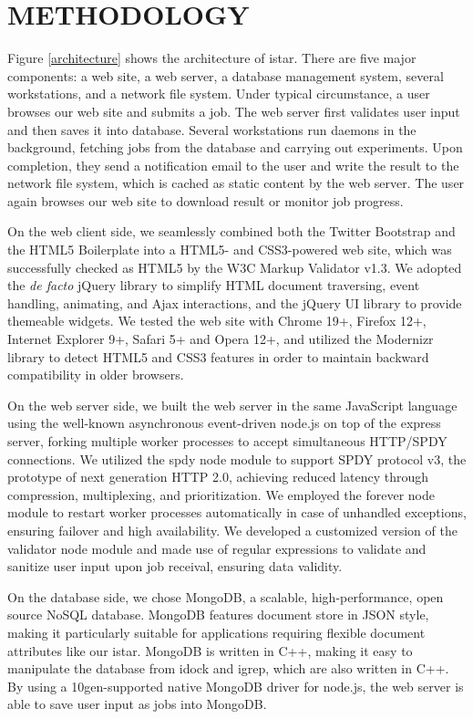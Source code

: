 \documentclass[12pt]{article}
\begin{document}
\section*{\sffamily \Large METHODOLOGY}

Figure \ref{architecture} shows the architecture of istar. There are five major components: a web site, a web server, a database management system, several workstations, and a network file system. Under typical circumstance, a user browses our web site and submits a job. The web server first validates user input and then saves it into database. Several workstations run daemons in the background, fetching jobs from the database and carrying out experiments. Upon completion, they send a notification email to the user and write the result to the network file system, which is cached as static content by the web server. The user again browses our web site to download result or monitor job progress.

On the web client side, we seamlessly combined both the Twitter Bootstrap and the HTML5 Boilerplate into a HTML5- and CSS3-powered web site, which was successfully checked as HTML5 by the W3C Markup Validator v1.3. We adopted the \textit{de facto} jQuery library to simplify HTML document traversing, event handling, animating, and Ajax interactions, and the jQuery UI library to provide themeable widgets. We tested the web site with Chrome 19+, Firefox 12+, Internet Explorer 9+, Safari 5+ and Opera 12+, and utilized the Modernizr library to detect HTML5 and CSS3 features in order to maintain backward compatibility in older browsers.

On the web server side, we built the web server in the same JavaScript language using the well-known asynchronous event-driven node.js on top of the express server, forking multiple worker processes to accept simultaneous HTTP/SPDY connections. We utilized the spdy node module to support SPDY protocol v3, the prototype of next generation HTTP 2.0, achieving reduced latency through compression, multiplexing, and prioritization. We employed the forever node module to restart worker processes automatically in case of unhandled exceptions, ensuring failover and high availability. We developed a customized version of the validator node module and made use of regular expressions to validate and sanitize user input upon job receival, ensuring data validity.

On the database side, we chose MongoDB, a scalable, high-performance, open source NoSQL database. MongoDB features document store in JSON style, making it particularly suitable for applications requiring flexible document attributes like our istar. MongoDB is written in C++, making it easy to manipulate the database from idock and igrep, which are also written in C++. By using a 10gen-supported native MongoDB driver for node.js, the web server is able to save user input as jobs into MongoDB.
\end{document}

